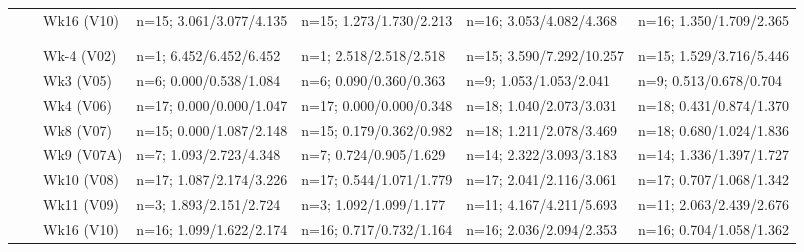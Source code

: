 \documentclass[
]{article}
\begin{document}
\begin{table}[!h]
\begin{tabular}[t]{lllllll}
\cmidrule{3-7}
\hspace{1em}\hspace{1em} &  & Wk16 (V10) & n=15; 3.061/3.077/4.135 & n=15; 1.273/1.730/2.213 & n=16; 3.053/4.082/4.368 & n=16; 1.350/1.709/2.365\\
\cmidrule{1-7}
\addlinespace[0.3em]
\multicolumn{7}{l}{\textbf{VK/VL}}\\
\addlinespace[0.3em]
\multicolumn{7}{l}{\textit{20µg}}\\
\hspace{1em}\hspace{1em} &  & Wk-4 (V02) & n=1; 6.452/6.452/6.452 & n=1; 2.518/2.518/2.518 & n=15; 3.590/7.292/10.257 & n=15; 1.529/3.716/5.446\\
\cmidrule{3-7}
\hspace{1em}\hspace{1em} &  & Wk3 (V05) & n=6; 0.000/0.538/1.084 & n=6; 0.090/0.360/0.363 & n=9; 1.053/1.053/2.041 & n=9; 0.513/0.678/0.704\\
\cmidrule{3-7}
\hspace{1em}\hspace{1em} &  & Wk4 (V06) & n=17; 0.000/0.000/1.047 & n=17; 0.000/0.000/0.348 & n=18; 1.040/2.073/3.031 & n=18; 0.431/0.874/1.370\\
\cmidrule{3-7}
\hspace{1em}\hspace{1em} &  & Wk8 (V07) & n=15; 0.000/1.087/2.148 & n=15; 0.179/0.362/0.982 & n=18; 1.211/2.078/3.469 & n=18; 0.680/1.024/1.836\\
\cmidrule{3-7}
\hspace{1em}\hspace{1em} &  & Wk9 (V07A) & n=7; 1.093/2.723/4.348 & n=7; 0.724/0.905/1.629 & n=14; 2.322/3.093/3.183 & n=14; 1.336/1.397/1.727\\
\cmidrule{3-7}
\hspace{1em}\hspace{1em} &  & Wk10 (V08) & n=17; 1.087/2.174/3.226 & n=17; 0.544/1.071/1.779 & n=17; 2.041/2.116/3.061 & n=17; 0.707/1.068/1.342\\
\cmidrule{3-7}
\hspace{1em}\hspace{1em} &  & Wk11 (V09) & n=3; 1.893/2.151/2.724 & n=3; 1.092/1.099/1.177 & n=11; 4.167/4.211/5.693 & n=11; 2.063/2.439/2.676\\
\cmidrule{3-7}
\hspace{1em}\hspace{1em} &  & Wk16 (V10) & n=16; 1.099/1.622/2.174 & n=16; 0.717/0.732/1.164 & n=16; 2.036/2.094/2.353 & n=16; 0.704/1.058/1.362\\

\end{tabular}
\end{table}
\end{document}
